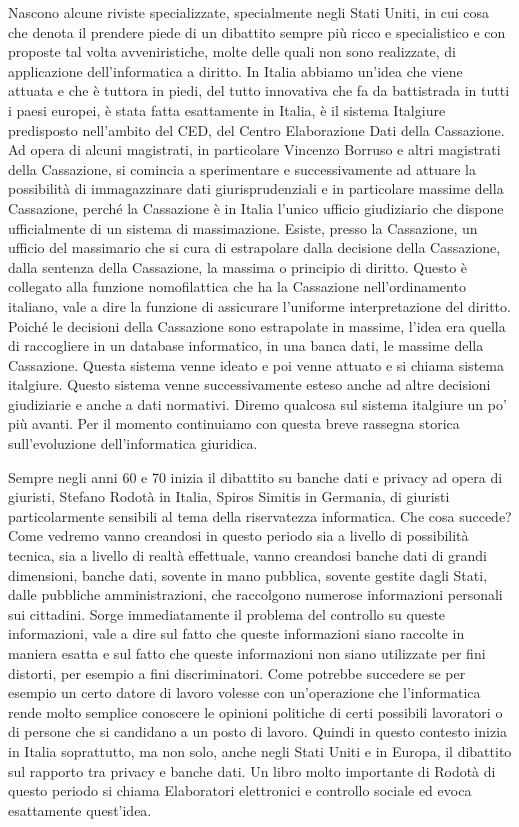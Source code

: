 Nascono alcune riviste specializzate, specialmente negli Stati Uniti, in cui cosa che denota il prendere piede di un dibattito sempre più ricco e specialistico e con proposte tal volta avveniristiche, molte delle quali non sono realizzate, di applicazione dell'informatica a diritto. In Italia abbiamo un'idea che viene attuata e che è tuttora in piedi, del tutto innovativa che fa da battistrada in tutti i paesi europei, è stata fatta esattamente in Italia, è il sistema Italgiure predisposto nell'ambito del CED, del Centro Elaborazione Dati della Cassazione. Ad opera di alcuni magistrati, in particolare Vincenzo Borruso e altri magistrati della Cassazione, si comincia a sperimentare e successivamente ad attuare la possibilità di immagazzinare dati giurisprudenziali e in particolare massime della Cassazione, perché la Cassazione è in Italia l'unico ufficio giudiziario che dispone ufficialmente di un sistema di massimazione. Esiste, presso la Cassazione, un ufficio del massimario che si cura di estrapolare dalla decisione della Cassazione, dalla sentenza della Cassazione, la massima o principio di diritto. Questo è collegato alla funzione nomofilattica che ha la Cassazione nell'ordinamento italiano, vale a dire la funzione di assicurare l'uniforme interpretazione del diritto. Poiché le decisioni della Cassazione sono estrapolate in massime, l'idea era quella di raccogliere in un database informatico, in una banca dati, le massime della Cassazione. Questa sistema venne ideato e poi venne attuato e si chiama sistema italgiure. Questo sistema venne successivamente esteso anche ad altre decisioni giudiziarie e anche a dati normativi. Diremo qualcosa sul sistema italgiure un po' più avanti. Per il momento continuiamo con questa breve rassegna storica sull'evoluzione dell'informatica giuridica. \par 
Sempre negli anni 60 e 70 inizia il dibattito su banche dati e privacy ad opera di giuristi, Stefano Rodotà in Italia, Spiros Simitis in Germania, di giuristi particolarmente sensibili al tema della riservatezza informatica. Che cosa succede? Come vedremo vanno creandosi in questo periodo sia a livello di possibilità tecnica, sia a livello di realtà effettuale, vanno creandosi banche dati di grandi dimensioni, banche dati, sovente in mano pubblica, sovente gestite dagli Stati, dalle pubbliche amministrazioni, che raccolgono numerose informazioni personali sui cittadini. Sorge immediatamente il problema del controllo su queste informazioni, vale a dire sul fatto che queste informazioni siano raccolte in maniera esatta e sul fatto che queste informazioni non siano utilizzate per fini distorti, per esempio a fini discriminatori. Come potrebbe succedere se per esempio un certo datore di lavoro volesse con un'operazione che l'informatica rende molto semplice conoscere le opinioni politiche di certi possibili lavoratori o di persone che si candidano a un posto di lavoro. Quindi in questo contesto inizia in Italia soprattutto, ma non solo, anche negli Stati Uniti e in Europa, il dibattito sul rapporto tra privacy e banche dati. Un libro molto importante di Rodotà di questo periodo si chiama Elaboratori elettronici e controllo sociale ed evoca esattamente quest'idea. \par
